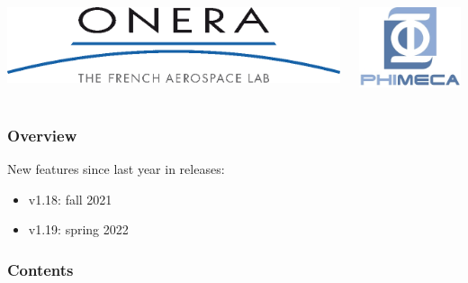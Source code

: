 \documentclass[aspectratio=169]{beamer}
\begin{document}
\begin{frame}
\begin{columns}
  \begin{center}
\includegraphics[height=0.05\textheight]{figures/onera-logo.png}
\end{center}

  \begin{center}
\includegraphics[height=0.08\textheight]{figures/logo-phimeca.png}
\end{center}


  \end{columns}

  \end{frame}

\begin{frame}
\frametitle{Overview}

New features since last year in releases:

\begin{itemize}
\item v1.18: fall 2021
\item v1.19: spring 2022
\end{itemize}

\end{frame}
  

\begin{frame}
\frametitle{Contents}
\tableofcontents
\end{frame}

\end{document}
